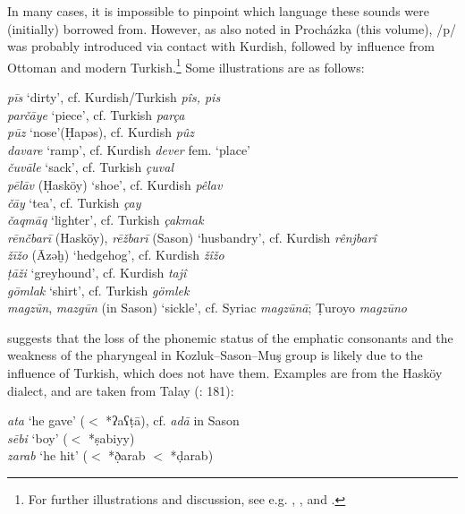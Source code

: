 \documentclass[output=paper]{langsci/langscibook}
\begin{document}
In many cases, it is impossible to pinpoint which language these sounds were (initially) borrowed from. However, as also noted in Proch\'{a}zka (this volume), /p/ was probably introduced via contact with Kurdish, followed by influence from Ottoman and modern Turkish.\footnote{For further illustrations and discussion, see e.g. \citet{VockeWaldner1982}, \citet{Jastrow2011anatolian}, \cite{Talay2002,Talay2007} and \citet{GrigoreBituna2012}.} Some illustrations are as follows:

\ea 
\noindent \textit{p\={i}s} `dirty', cf. Kurdish/Turkish \textit{p\^{i}s, pis}\\
\textit{par\v{c}\={a}ye} `piece', cf. Turkish \textit{par\c{c}a}\\
\textit{p\={u}z} `nose'(\d{H}apəs), cf. Kurdish \textit{p\^{u}z}\\ 
\textit{davare} `ramp', cf. Kurdish \textit{dever} fem. `place'\\
\textit{\v{c}uv\={a}le} `sack', cf. Turkish \textit{\c{c}uval} \\
\textit{pēlāv} (\d{H}ask\"{o}y) `shoe', cf. Kurdish \textit{p\^{e}lav}\\
\textit{\v{c}\={a}y} `tea', cf. Turkish \textit{\c{c}ay}\\
\textit{\v{c}aqm\={a}q} `lighter', cf. Turkish \textit{\c{c}akmak}\\
\textit{rēnčbarī} (Hasköy), \textit{rē\v{z}barī} (Sason) `husbandry', cf. Kurdish \textit{rênjbarî}\\
\textit{žīžo} (Āzəḫ) `hedgehog', cf. Kurdish \textit{žîžo} \\
\textit{ṭāži} `greyhound', cf. Kurdish \textit{tajî} \\
\textit{g\={o}mlak} `shirt', cf. Turkish \textit{g\"{o}mlek}\\
\textit{magz\={u}n}, \textit{mazg\={u}n} (in Sason) `sickle', cf. Syriac \textit{magz\={u}n\={a}}; \d{T}uroyo \textit{magz\={u}no}\\
\z

\cite{Talay2007} suggests that the loss of the phonemic status of the emphatic consonants and the weakness of the pharyngeal in Kozluk--Sason--Mu\c{s} group is likely due to the influence of Turkish, which does not have them. Examples are from the Hask\"{o}y dialect, and are taken from Talay (\citeyear{Talay2007}: 181):

\ea
\noindent \textit{ata} `he gave' ($<$ *ʔaʕ\d{t}ā), cf. \textit{ad\={a}} in Sason\\
\textit{sēbi} `boy' ($<$ *\d{s}abiyy)\\
\textit{zarab} `he hit' ($<$ *\d{ð}arab $<$ *\d{d}arab)\\
\z
\end{document}
